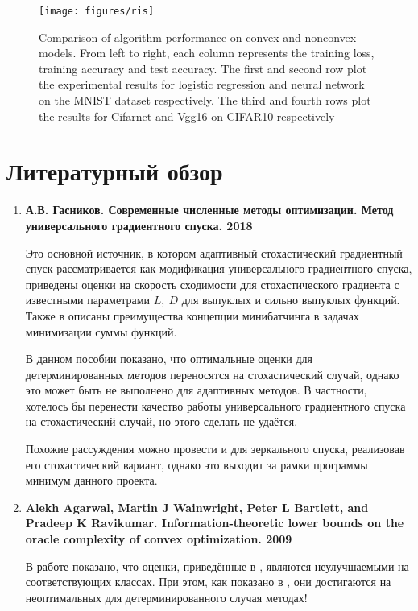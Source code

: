 \documentclass[]{scrartcl}
\begin{document}
\begin{figure}[H]
	\centering
	\texttt{[image: figures/ris]}
	\caption[Figure 1:]{Comparison of algorithm performance on convex and nonconvex models. From left to right, each column represents the training loss, training accuracy and test accuracy. The first and second row plot the experimental results for logistic regression and neural network on the MNIST dataset respectively. The third and fourth rows plot the results for Cifarnet and Vgg16 on CIFAR10 respectively}
	\label{fig:ris}
\end{figure}

\section{Литературный обзор}
\begin{enumerate}
	\item \textbf{А.В. Гасников. Современные численные методы оптимизации. Метод универсального градиентного спуска. 2018 \cite{gas}}

Это основной источник, в котором адаптивный стохастический градиентный спуск рассматривается как модификация универсального градиентного спуска, приведены оценки на скорость сходимости для стохастического градиента с известными параметрами $L,~D$ для выпуклых и сильно выпуклых функций. Также в \cite{gas} описаны преимущества концепции минибатчинга в задачах минимизации суммы функций.

В данном пособии показано, что оптимальные оценки для детерминированных методов переносятся на стохастический случай, однако это может быть не выполнено для адаптивных методов. В частности, хотелось бы перенести качество работы универсального градиентного спуска на стохастический случай, но этого сделать не удаётся.

Похожие рассуждения можно провести и для зеркального спуска, реализовав его стохастический вариант, однако это выходит за рамки программы минимум данного проекта. 

	\item \textbf{Alekh Agarwal, Martin J Wainwright, Peter L Bartlett, and Pradeep K Ravikumar. Information-theoretic
		lower bounds on the oracle complexity of convex optimization. 2009 \cite{agarwal2009information}}
	
	
В работе показано, что оценки, приведённые в \cite{gas}, являются неулучшаемыми на соответствующих классах. При этом, как показано в \cite{gas}, они достигаются на неоптимальных для детерминированного случая методах!


\end{enumerate}
\end{document}
